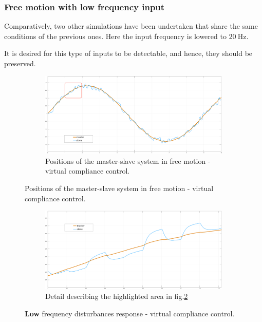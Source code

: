 \subsubsection{Free motion with low frequency input}

Comparatively, two other simulations have been undertaken that share the same
conditions of the previous ones. Here the input frequency is lowered to $20 \ \text{Hz}$.

It is desired for this type of inputs to be detectable, and hence, they should be preserved. 

\begin{figure}[H]
	\begin{subfigure}{1\linewidth}
		\centering
		\includegraphics[width=\textwidth, height=0.48\textwidth]{Images/freeSet20Tot20HtznoiseRect}
		\caption{Positions of the master-slave system in free motion - virtual compliance control.}
		\label{fig:freeSetTot20HR}
	\end{subfigure}
\end{figure}
\begin{figure}\ContinuedFloat
	\begin{subfigure}{1\linewidth}
		\centering
		\includegraphics[width=\textwidth, height=0.48\textwidth]{Images/freeSet20Part20Htznoise}
		\caption{Detail describing the highlighted area in fig.\ref{fig:freeSetTot20HR}}
		\label{fig:freeSetPar20HR}
	\end{subfigure}	
	\caption{\textbf{Low} frequency disturbances response - virtual compliance control.}
\end{figure}

